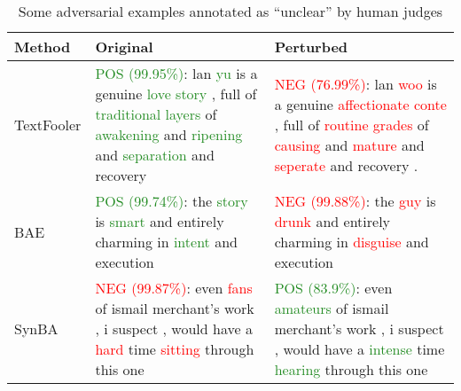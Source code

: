 \begin{table}[h]
    \footnotesize
    \centering
    \begin{tabularx}{\textwidth}{|l|X|X|}
    \hline
    Method   &   Original    &   Perturbed\\ \hline\hline
    TextFooler & \textcolor{ForestGreen}{POS (99.95\%)}: lan \textcolor{ForestGreen}{yu} is a genuine \textcolor{ForestGreen}{love story} , full of \textcolor{ForestGreen}{traditional layers} of \textcolor{ForestGreen}{awakening} and \textcolor{ForestGreen}{ripening} and \textcolor{ForestGreen}{separation} and recovery  &  \textcolor{red}{NEG (76.99\%)}: lan \textcolor{red}{woo} is a genuine \textcolor{red}{affectionate conte} , full of \textcolor{red}{routine grades} of \textcolor{red}{causing} and \textcolor{red}{mature} and \textcolor{red}{seperate} and recovery . \\ \hline
    BAE &  \textcolor{ForestGreen}{POS (99.74\%)}: the \textcolor{ForestGreen}{story} is \textcolor{ForestGreen}{smart} and entirely charming in \textcolor{ForestGreen}{intent} and execution  & \textcolor{red}{NEG (99.88\%)}: the \textcolor{red}{guy} is \textcolor{red}{drunk} and entirely charming in \textcolor{red}{disguise} and execution \\ \hline
    SynBA &  \textcolor{red}{NEG (99.87\%)}: even \textcolor{red}{fans} of ismail merchant's work , i suspect , would have a \textcolor{red}{hard} time \textcolor{red}{sitting} through this one &  \textcolor{ForestGreen}{POS (83.9\%)}: even \textcolor{ForestGreen}{amateurs} of ismail merchant's work , i suspect , would have a \textcolor{ForestGreen}{intense} time \textcolor{ForestGreen}{hearing} through this one \\
    \hline
\end{tabularx}
    \caption{Some adversarial examples annotated as “unclear” by human judges}
    \label{tab:unclear-examples}
\end{table}


